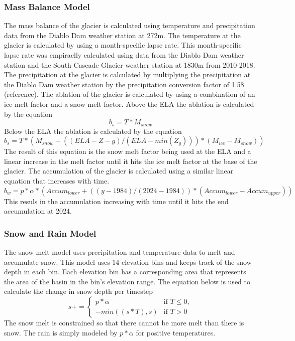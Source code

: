 \documentclass{article}
\begin{document}
\subsubsection{Mass Balance Model}
The mass balance of the glacier is calculated using temperature and precipitation data from the Diablo Dam weather station at 272m. The 
temperature at the glacier is calculated by using a month-specific lapse rate. This month-specific lapse rate was empiraclly calculated using
data from the Diablo Dam weather station and the South Cascade Glacier weather station at 1830m from 2010-2018. The precipitation at the 
glacier is calculated by multiplying the precipitation at the Diablo Dam weather station by the precipitation conversion factor of 1.58 
(reference). The ablation of the glacier is calculated by using a combination of an ice melt factor and a snow melt factor. Above the ELA the 
ablation is calculated by the equation
\begin{equation}b_s=T*M_{snow}\end{equation}
Below the ELA the ablation is calculated by the equation
\begin{equation}b_s=T*(M_{snow}+((ELA-Z-g)/(ELA-min(Z_g)))*(M_{ice}-M_{snow}))\end{equation}
The result of this equation is the snow melt factor being used at the ELA and a linear increase in the melt factor until it hits the ice melt 
factor at the base of the glacier. 
The accumulation of the glacier is calculated using a similar linear equation that increases with time.
\begin{equation}b_w=p*\alpha*({Accum}_{lower}+((y-1984)/(2024-1984))*({Accum}_{lower}-{Accum}_{upper}))\end{equation}
This resuls in the accumulation increasing with time until it hits the end accumulation at 2024. 

\subsubsection{Snow and Rain Model}
The snow melt model uses precipitation and temperature data to melt and accumulate snow. This model uses 14 elevation bins and keeps track 
of the snow depth in each bin. Each elevation bin has a corresponding area that represents the area of the basin in the bin's elevation range. 
The equation below is used to calculate the change in snow depth per timestep 
\begin{equation}s += 
\begin{cases} 
  p*\alpha & \text{if } T \leq 0,\\
  -min((s*T),s) & \text{if } T > 0
\end{cases}\end{equation}
The snow melt is constrained so that there cannot be more melt than there is snow. The rain is simply modeled by $p*\alpha$ for positive 
temperatures.
\end{document}
